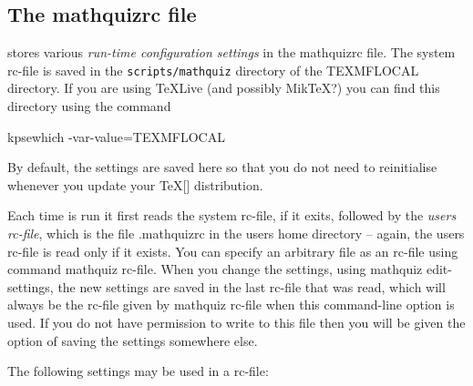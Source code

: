\documentclass[svgnames]{article}
\newcommand\ddash{\texttt{\textemdash\textemdash}}
\newcommand\mathquizopt[1]{\textsf{mathquiz \ddash#1}}
\newcommand\mathquizrc{\index{mathquizrc}\textsf{mathquizrc}\xspace}
\begin{document}
    \subsection{The \mathquizrc file}\label{SS:customisation}\label{SS:rcfile}

    \MathQuiz stores various \textit{run-time configuration settings} in
    the \mathquizrc file. The system rc-file is saved in the
    \texttt{scripts/mathquiz} directory of the \textsf{TEXMFLOCAL}
    directory. If you are using \TeX Live (and possibly Mik\TeX?) you can
    find this directory using the command
    \begin{center}
            \textsf{kpsewhich -var-value=TEXMFLOCAL}
    \end{center}
    By default, the \MathQuiz settings are saved here so that you do not
    need to reinitialise \MathQuiz whenever you update your \TeX[]
    distribution.

    Each time \MathQuiz is run it first reads the system rc-file, if it
    exits, followed by the \textit{users rc-file}, which is the file
    \textsf{.mathquizrc} in the users home directory -- again, the users
    rc-file is read only if it exists. You can specify an arbitrary file
    as an rc-file using command  \mathquizopt{rc-file}. When you change
    the \MathQuiz settings, using \mathquizopt{edit-settings}, the new
    settings are saved in the last rc-file that was read, which will
    always be the rc-file given by \mathquizopt{rc-file} when this
    command-line option is used.  If you do not have permission to write
    to this file then you will be given the option of saving the
    settings somewhere else.

    The following settings may be used in a \MathQuiz rc-file:
\end{document}
